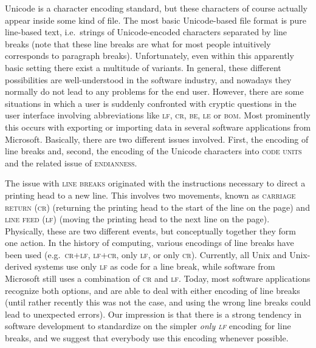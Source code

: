 Unicode is a character encoding standard, but these characters of course actually appear inside some kind of file. The most basic Unicode-based file format is pure line-based text, i.e.~strings of Unicode-encoded characters separated by line breaks (note that these line breaks are what for most people intuitively corresponds to paragraph breaks). Unfortunately, even within this apparently basic setting there exist a multitude of variants. In general, these different possibilities are well-understood in the software industry, and nowadays they normally do not lead to any problems for the end user. However, there are some situations in which a user is suddenly confronted with cryptic questions in the user interface involving abbreviations like \textsc{lf}, \textsc{cr}, \textsc{be}, \textsc{le} or \textsc{bom}. Most prominently this occurs with exporting or importing data in several software applications from Microsoft. Basically, there are two different issues involved. First, the encoding of line breaks and, second, the encoding of the Unicode characters into \textsc{code units} and the related issue of \textsc{endianness}.

The issue with \textsc{line breaks} originated with the instructions necessary to direct a printing head to a new line. This involves two movements, known as \textsc{carriage return (cr)} (returning the printing head to the start of the line on the page) and \textsc{line feed (lf)} (moving the printing head to the next line on the page). Physically, these are two different events, but conceptually together they form one action. In the history of computing, various encodings of line breaks have been used (e.g.~\textsc{cr+lf}, \textsc{lf+cr}, only \textsc{lf}, or only \textsc{cr}). Currently, all Unix and Unix-derived systems use only \textsc{lf} as code for a line break, while software from Microsoft still uses a combination of \textsc{cr} and \textsc{lf}. Today, most software applications recognize both options, and are able to deal with either encoding of line breaks (until rather recently this was not the case, and using the wrong line breaks could lead to unexpected errors). Our impression is that there is a strong tendency in software development to standardize on the simpler \textit{only \textsc{lf}} encoding for line breaks, and we suggest that everybody use this encoding whenever possible.

